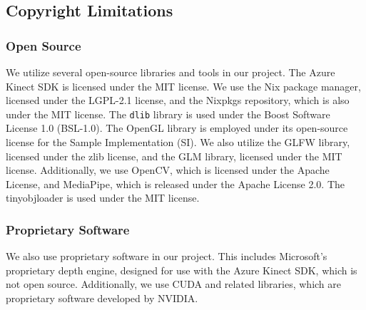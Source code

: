 \subsection{Copyright Limitations}
\subsubsection{Open Source}
We utilize several open-source libraries and tools in our project. The Azure Kinect SDK is licensed under the MIT license. We use the Nix package manager, licensed under the LGPL-2.1 license, and the Nixpkgs repository, which is also under the MIT license. The \texttt{dlib} library is used under the Boost Software License 1.0 (BSL-1.0). The OpenGL library is employed under its open-source license for the Sample Implementation (SI). We also utilize the GLFW library, licensed under the zlib license, and the GLM library, licensed under the MIT license. Additionally, we use OpenCV, which is licensed under the Apache License, and MediaPipe, which is released under the Apache License 2.0. The tinyobjloader is used under the MIT license.

\subsubsection{Proprietary Software}
We also use proprietary software in our project. This includes Microsoft's proprietary depth engine, designed for use with the Azure Kinect SDK, which is not open source. Additionally, we use CUDA and related libraries, which are proprietary software developed by NVIDIA.
